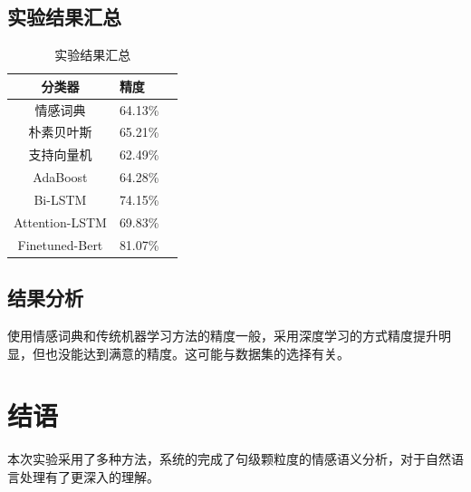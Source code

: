 \documentclass[hyperref,a4paper,UTF8]{ctexart}
\begin{document}
\subsection{实验结果汇总}

\begin{table}[ht]
    \centering
    \begin{tabular}{c|lr} %
        \toprule
        分类器 & 精度\\
        \midrule
        情感词典 & 64.13\% \\
        \hline  
        朴素贝叶斯 & 65.21\% \\
        \hline  
        支持向量机 & 62.49\% \\
        \hline  
        AdaBoost & 64.28\%  \\
        \hline  
        Bi-LSTM & 74.15\%  \\
        \hline  
        Attention-LSTM & 69.83\%  \\
        \hline  
        Finetuned-Bert & 81.07\%  \\
        \hline  
        \bottomrule
    \end{tabular}
    \caption{实验结果汇总}
    \label{tab:example}
\end{table}

\subsection{结果分析}

使用情感词典和传统机器学习方法的精度一般，采用深度学习的方式精度提升明显，但也没能达到满意的精度。这可能与数据集的选择有关。

\section{结语}

本次实验采用了多种方法，系统的完成了句级颗粒度的情感语义分析，对于自然语言处理有了更深入的理解。











\newpage


\end{document}
